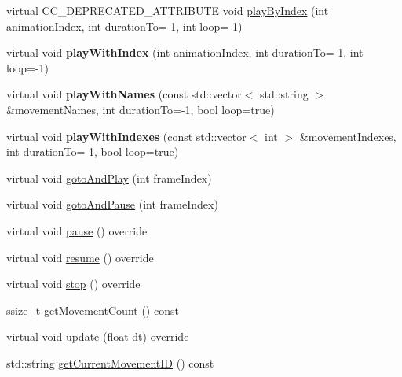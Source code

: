 \begin{DoxyCompactItemize}
\item 
virtual C\+C\+\_\+\+D\+E\+P\+R\+E\+C\+A\+T\+E\+D\+\_\+\+A\+T\+T\+R\+I\+B\+U\+TE void \hyperlink{classcocostudio_1_1ArmatureAnimation_a4d35f44e90dfaf05b81c3bf69db59eae}{play\+By\+Index} (int animation\+Index, int duration\+To=-\/1, int loop=-\/1)
\item 
\mbox{\label{classcocostudio_1_1ArmatureAnimation_afd798e5d37dbea29732b39ecd2a321d4}} 
virtual void {\bfseries play\+With\+Index} (int animation\+Index, int duration\+To=-\/1, int loop=-\/1)
\item 
\mbox{\label{classcocostudio_1_1ArmatureAnimation_a6ed521f8e216adf030cc838ffec3fecc}} 
virtual void {\bfseries play\+With\+Names} (const std\+::vector$<$ std\+::string $>$ \&movement\+Names, int duration\+To=-\/1, bool loop=true)
\item 
\mbox{\label{classcocostudio_1_1ArmatureAnimation_aaa86e5dda4049055b0485999b1586344}} 
virtual void {\bfseries play\+With\+Indexes} (const std\+::vector$<$ int $>$ \&movement\+Indexes, int duration\+To=-\/1, bool loop=true)
\item 
virtual void \hyperlink{classcocostudio_1_1ArmatureAnimation_a24a591185feda3b3874c5d66bc01d9a7}{goto\+And\+Play} (int frame\+Index)
\item 
virtual void \hyperlink{classcocostudio_1_1ArmatureAnimation_aff8187d8018c08e7c62a6dbd1255558f}{goto\+And\+Pause} (int frame\+Index)
\item 
virtual void \hyperlink{classcocostudio_1_1ArmatureAnimation_a103b323b5c00970fbd09a9ee5ae6b76a}{pause} () override
\item 
virtual void \hyperlink{classcocostudio_1_1ArmatureAnimation_a79accb8d66ca70de4c5587b0018070b1}{resume} () override
\item 
virtual void \hyperlink{classcocostudio_1_1ArmatureAnimation_ae02f5a30490aa9782b52f89e27470128}{stop} () override
\item 
ssize\+\_\+t \hyperlink{classcocostudio_1_1ArmatureAnimation_a1f32fed1a5f939a878df9f8355c412e3}{get\+Movement\+Count} () const
\item 
virtual void \hyperlink{classcocostudio_1_1ArmatureAnimation_a6ae1a77029ac2fe5663d2b997f54b245}{update} (float dt) override
\item 
std\+::string \hyperlink{classcocostudio_1_1ArmatureAnimation_a62ad0fdb64386138a022e4fca276f499}{get\+Current\+Movement\+ID} () const

\end{DoxyCompactItemize}
